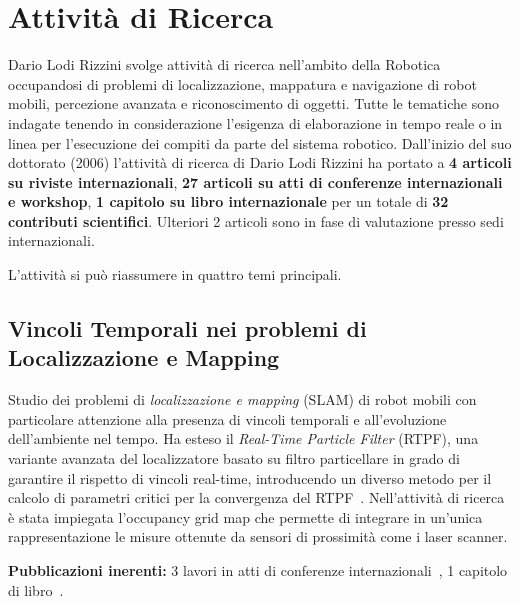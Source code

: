 \documentclass[11pt]{article}
\begin{document}

\section{Attivit\`a di Ricerca}

Dario Lodi Rizzini svolge attivit\`a di ricerca nell'ambito della Robotica occupandosi 
di problemi di localizzazione, mappatura e navigazione di robot mobili,
percezione avanzata e riconoscimento di oggetti.
Tutte le tematiche sono indagate tenendo in considerazione l'esigenza di elaborazione 
in tempo reale o in linea per l'esecuzione dei compiti da parte del sistema robotico. 
Dall'inizio del suo dottorato (2006) l'attivit\`a di ricerca di Dario Lodi Rizzini ha 
portato a 
\textbf{4 articoli su riviste internazionali}, 
\textbf{27 articoli su atti di conferenze internazionali e workshop},
\textbf{1 capitolo su libro internazionale} 
per un totale di \textbf{32 contributi scientifici}.
Ulteriori 2 articoli sono in fase di valutazione presso sedi internazionali.
 
L'attivit\`a si pu\`o riassumere in quattro temi principali.  

\subsection*{Vincoli Temporali nei problemi di Localizzazione e Mapping}

Studio dei problemi di \emph{localizzazione e mapping} (SLAM) di robot mobili con particolare 
attenzione alla presenza di vincoli temporali e all'evoluzione dell'ambiente nel tempo.
Ha esteso il \emph{Real-Time Particle Filter} (RTPF), una variante 
avanzata del localizzatore basato su filtro particellare in grado di 
garantire il rispetto di vincoli real-time, introducendo un diverso metodo 
per il calcolo di parametri critici per la convergenza del RTPF~\cite{lodirizzini2007icinco,lodirizzini2007ecmr,lodirizzini2008improved}.
Nell'attivit\`a di ricerca \`e stata impiegata l'occupancy grid map che permette di integrare 
in un'unica rappresentazione le misure ottenute da sensori di prossimit\`a come i laser scanner.

\textbf{Pubblicazioni inerenti:}
3 lavori in atti di conferenze internazionali~\cite{grisetti2008icra,lodirizzini2007icinco,lodirizzini2007ecmr},
1 capitolo di libro~\cite{lodirizzini2008improved}.
\end{document}
